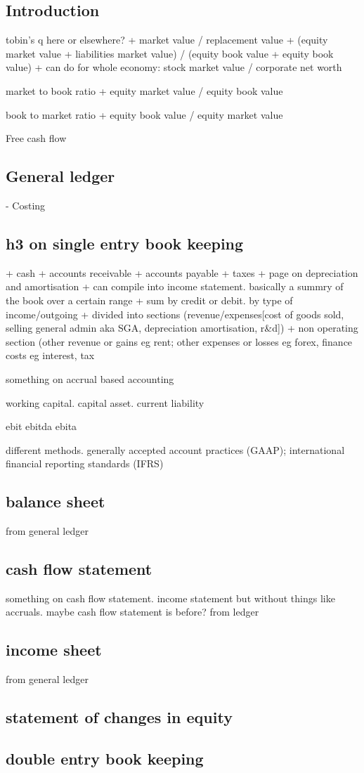 
\subsection{Introduction}

tobin's q here or elsewhere?
+ market value / replacement value
+ (equity market value + liabilities market value) / (equity book value + equity book value)
+ can do for whole economy: stock market value / corporate net worth

market to book ratio
+ equity market value / equity book value

book to market ratio
+ equity book value / equity market value


Free cash flow

\subsection{General ledger}
- Costing
\subsection{h3 on single entry book keeping}

+ cash
+ accounts receivable
+ accounts payable
+ taxes
+ page on depreciation and amortisation
+ can compile into income statement. basically a summry of the book over a certain range
+ sum by credit or debit. by type of income/outgoing
+ divided into sections (revenue/expenses[cost of goods sold, selling general admin aka SGA, depreciation amortisation, r\&d])
+ non operating section (other revenue or gains eg rent; other expenses or losses eg forex, finance costs eg interest, tax

something on accrual based accounting

working capital. capital asset. current liability

ebit
ebitda
ebita

different methods. generally accepted account practices (GAAP); international financial reporting standards (IFRS)

\subsection{balance sheet}
from general ledger
\subsection{cash flow statement}
something on cash flow statement. income statement but without things like accruals. maybe cash flow statement is before?
from ledger
\subsection{income sheet}
from general ledger
\subsection{statement of changes in equity}
\subsection{double entry book keeping}

